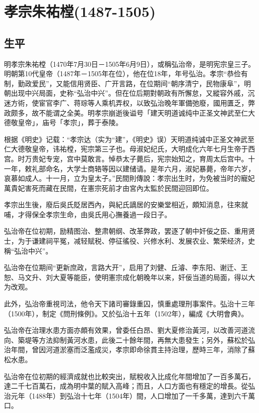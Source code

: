 
\section{孝宗朱祐樘\tiny(1487-1505)}

\subsection{生平}

明孝宗朱祐樘（1470年7月30日－1505年6月9日），或稱弘治帝，是明宪宗皇三子。明朝第10代皇帝（1487年－1505年在位），他在位18年，年号弘治。孝宗“恭俭有制，勤政爱民”，又能信用贤臣、广开言路，在位期间“朝序清宁，民物康阜”，明朝出现中兴局面，史称“弘治中兴”。但在位后期對朝政有所懈怠，又縱容外戚，沉迷方術，使宦官李广、蒋琮等人乘机弄权，以致弘治晚年軍備弛廢，國用匱乏，弊政颇多，故不能谓之全美。明孝宗崩逝後谥号「建天明道诚纯中正圣文神武至仁大德敬皇帝」，庙号「孝宗」，葬于泰陵。

根据《明史》记载：“孝宗达（实为“建”，《明史》误）天明道纯诚中正圣文神武至仁大德敬皇帝，讳祐樘，宪宗第三子也。母淑妃纪氏，大明成化六年七月生帝于西宫。时万贵妃专宠，宫中莫敢言。悼恭太子薨后，宪宗始知之，育周太后宫中。十一年，敕礼部命名，大学士商辂等因以建储请。是年六月，淑妃暴薨，帝年六岁，哀慕如成人。十一月，立为皇太子。”民間則傳說：孝宗出生时，为免被当时的寵妃萬貴妃害死而藏在民間，在憲宗死前才由宮內太監於民間迎回即位。

孝宗出生後，廢后吳氏貶居西內，與紀氏謫居的安樂堂相近，頗知消息，往來就哺，才得保全孝宗生命，由吳氏用心撫養過一段日子。

弘治帝在位初期，励精图治、整肃朝纲、改革弊政，罢逐了朝中奸佞之臣、重用贤士，为于谦建祠平冤，减轻赋税、停征徭役、兴修水利、发展农业、繁荣经济，史稱“弘治中兴”。

弘治帝在位期间“更新庶政，言路大开”，启用了刘健、丘濬、李东阳、谢迁、王恕、马文升、刘大夏等能臣，使明憲宗成化朝晚年以来，奸佞当道的局面，得以大为改观。

此外，弘治帝重視司法，他令天下諸司審錄重囚，慎重處理刑事案件。弘治十三年（1500年），制定《問刑條例》。又於弘治十五年（1502年），編成《大明會典》。

弘治帝在治理水患方面亦頗有效果，曾委任白昂、劉大夏修治黃河，以改善河道流向、築堤等方法抑制黃河水患，此後二十餘年間，再無大患發生；另外，蘇松於弘治年間，曾因河道淤塞而泛濫成災，孝宗即命徐貫主持治理，歷時三年，消除了蘇松水患。

弘治帝在位初期的經濟成就也比較突出，賦稅收入比成化年間增加了一百多萬石，達二千七百萬石，成為明中葉的賦入高峰；而且，人口方面也有穩定的增長。從弘治元年（1488年）到弘治十七年（1504年）間，人口增加了一千多萬，達到六千萬口。

